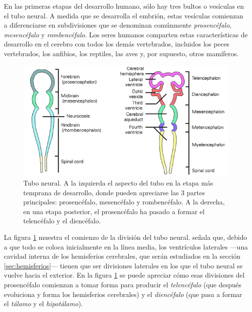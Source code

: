 En las primeras etapas del desarrollo humano, sólo hay tres bultos o vesículas en el tubo neural. A medida que se desarrolla el embrión, estas vesículas comienzan a diferenciarse en subdivisiones que se denominan comúnmente {\it prosencéfalo}, {\it mesencéfalo} y {\it rombencéfalo}. Los seres humanos comparten estas características de desarrollo en el cerebro con todos los demás vertebrados, incluidos los peces vertebrados, los anfibios, los reptiles, las aves y, por supuesto, otros mamíferos.


\begin{figure}[h]
  \begin{center}
    \includegraphics[width=\textwidth]{images/tubo-neural.png}
    \caption{Tubo neural. A la izquierda el aspecto del tubo en la etapa más temprana de desarrollo, donde pueden apreciarse las 3 partes principales: prosencéfalo, mesencéfalo y rombencéfalo. A la derecha, en una etapa posterior, el prosencéfalo ha pasado a formar el telencéfalo y el diencéfalo.}
    \label{tubo-neural}
  \end{center}
\end{figure}

La figura \ref{tubo-neural} muestra el comienzo de la división del tubo neural. \cite{Lautin2001} señala que, debido a que todo se coloca inicialmente en la línea media, los ventrículos laterales ---una cavidad interna de los hemisferios cerebrales, que serán estudiados en la sección \ref{sec:hemisferios}--- tienen que ser divisiones laterales en los que el tubo neural se vuelve hacia el exterior. En la figura \ref{tubo-neural} se puede apreciar cómo esas divisiones del prosencéfalo comienzan a tomar forma para producir el {\it telencéfalo} (que después evoluciona y forma los hemisferios cerebrales) y el {\it diencéfalo} (que pasa a formar el {\it tálamo} y el {\it hipotálamo}).

